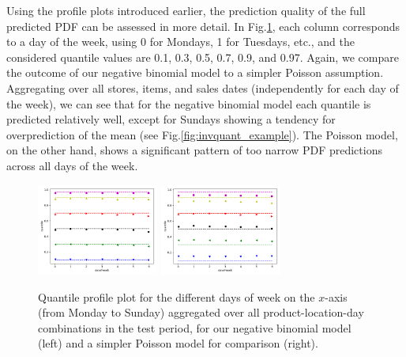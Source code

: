 \documentclass[BCOR=1mm, DIV=calc,10pt,
twoside=true,
twocolumn,
headings=normal]{scrartcl}
\newcommand{\fig}{Fig.}
\begin{document}
Using the profile plots introduced earlier, the prediction quality of the full predicted PDF can be assessed in more detail. In \fig \ref{fig:invquant_dayofweek}, each column corresponds to a day of the week, using 0 for Mondays, 1 for Tuesdays, etc., and the considered quantile values are 0.1, 0.3, 0.5, 0.7, 0.9, and 0.97. Again, we compare the outcome of our negative binomial model to a simpler Poisson assumption. Aggregating over all stores, items, and sales dates (independently for each day of the week), we can see that for the negative binomial model each quantile is predicted relatively well, except for Sundays showing a tendency for overprediction of the mean (see \fig \ref{fig:invquant_example}). The Poisson model, on the other hand, shows a significant pattern of too narrow PDF predictions across all days of the week.

\begin{figure}
\begin{center}
\includegraphics[width=4cm]{../figures/invquant_dayofweek_nbinom}
\includegraphics[width=4cm]{../figures/invquant_dayofweek_poisson}
\caption{\label{fig:invquant_dayofweek} Quantile profile plot for the different days of week on the $x$-axis (from Monday to Sunday) aggregated over all product-location-day combinations in the test period, for our negative binomial model (left) and a simpler Poisson model for comparison (right).}
\end{center}
\end{figure}
\end{document}
